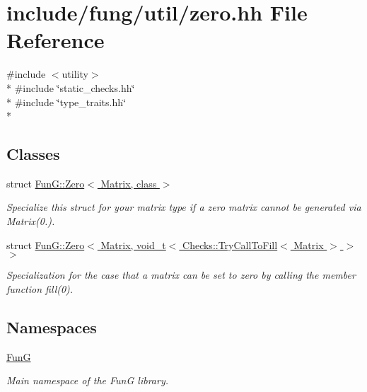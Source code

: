 \hypertarget{zero_8hh}{\section{include/fung/util/zero.hh File Reference}
\label{zero_8hh}
}
{\ttfamily \#include $<$utility$>$}\\*
{\ttfamily \#include \char`\"{}static\-\_\-checks.\-hh\char`\"{}}\\*
{\ttfamily \#include \char`\"{}type\-\_\-traits.\-hh\char`\"{}}\\*
\subsection*{Classes}
\begin{DoxyCompactItemize}
\item 
struct \hyperlink{structFunG_1_1Zero}{Fun\-G\-::\-Zero$<$ Matrix, class $>$}
\begin{DoxyCompactList}\small\item\em Specialize this struct for your matrix type if a zero matrix cannot be generated via Matrix(0.). \end{DoxyCompactList}\item 
struct \hyperlink{structFunG_1_1Zero_3_01Matrix_00_01void__t_3_01Checks_1_1TryCallToFill_3_01Matrix_01_4_01_4_01_4}{Fun\-G\-::\-Zero$<$ Matrix, void\-\_\-t$<$ Checks\-::\-Try\-Call\-To\-Fill$<$ Matrix $>$ $>$ $>$}
\begin{DoxyCompactList}\small\item\em Specialization for the case that a matrix can be set to zero by calling the member function fill(0). \end{DoxyCompactList}\end{DoxyCompactItemize}
\subsection*{Namespaces}
\begin{DoxyCompactItemize}
\item 
\hyperlink{namespaceFunG}{Fun\-G}
\begin{DoxyCompactList}\small\item\em Main namespace of the Fun\-G library. \end{DoxyCompactList}\end{DoxyCompactItemize}
